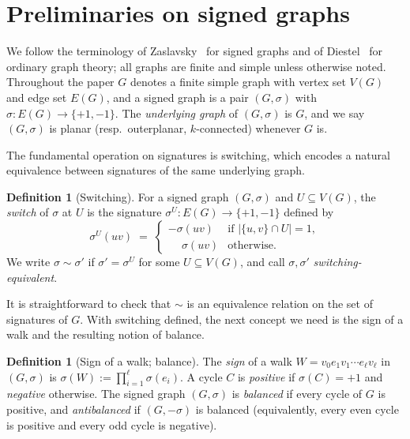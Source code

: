 \documentclass[11pt,a4paper]{article}
\theoremstyle{plain}
\theoremstyle{definition}
\newtheorem{definition}[theorem]{Definition}
\newcommand{\E}{E}
\newcommand{\V}{V}
\newcommand{\Gs}{(G,\sigma)}
\begin{document}
\section{Preliminaries on signed graphs}\label{sec:preliminaries}

We follow the terminology of Zaslavsky~\cite{Zaslavsky1982} for
signed graphs and of Diestel~\cite{Diestel} for ordinary graph
theory; all graphs are finite and simple unless otherwise noted.
Throughout the paper $G$ denotes a finite simple graph with vertex
set $\V(G)$ and edge set $\E(G)$, and a signed graph is a pair
$\Gs$ with $\sigma:\E(G)\to\{+1,-1\}$. The \emph{underlying graph}
of $\Gs$ is $G$, and we say $\Gs$ is planar (resp.\ outerplanar,
$k$-connected) whenever $G$ is.

The fundamental operation on signatures is switching, which
encodes a natural equivalence between signatures of the same
underlying graph.

\begin{definition}[Switching]\label{def:switching}
For a signed graph $\Gs$ and $U\subseteq\V(G)$, the \emph{switch} of
$\sigma$ at $U$ is the signature $\sigma^U:\E(G)\to\{+1,-1\}$
defined by
\[
   \sigma^U(uv) \;=\;
   \begin{cases}
   -\sigma(uv) & \text{if } |\{u,v\}\cap U|=1,\\
   \phantom{-}\sigma(uv) & \text{otherwise.}
   \end{cases}
\]
We write $\sigma\sim\sigma'$ if $\sigma'=\sigma^U$ for some
$U\subseteq\V(G)$, and call $\sigma,\sigma'$
\emph{switching-equivalent}.
\end{definition}

It is straightforward to check that $\sim$ is an equivalence
relation on the set of signatures of $G$. With switching defined,
the next concept we need is the sign of a walk and the resulting
notion of balance.

\begin{definition}[Sign of a walk; balance]\label{def:sign}
The \emph{sign} of a walk $W=v_0e_1v_1\cdots e_\ell v_\ell$ in $\Gs$
is $\sigma(W):=\prod_{i=1}^{\ell}\sigma(e_i)$. A cycle $C$ is
\emph{positive} if $\sigma(C)=+1$ and \emph{negative} otherwise.
The signed graph $\Gs$ is \emph{balanced} if every cycle of $G$ is
positive, and \emph{antibalanced} if $(G,-\sigma)$ is balanced
(equivalently, every even cycle is positive and every odd cycle is
negative).
\end{definition}
\end{document}
